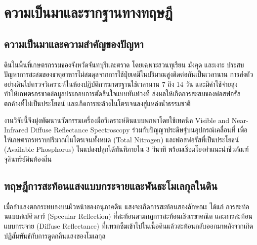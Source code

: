 \documentclass[12pt,a4paper,oneside]{book}
\begin{document}
\clearpage
\tableofcontents

\mainmatter

\chapter{ความเป็นมาและรากฐานทางทฤษฎี}

\section{ความเป็นมาและความสำคัญของปัญหา}
ดินในพื้นที่เกษตรกรรมของจังหวัดจันทบุรีและตราด โดยเฉพาะสวนทุเรียน มังคุด และเงาะ ประสบปัญหาการสะสมของธาตุอาหารไม่สมดุลจากการใช้ปุ๋ยเคมีในปริมาณสูงติดต่อกันเป็นเวลานาน การส่งตัวอย่างดินไปตรวจวิเคราะห์ในห้องปฏิบัติการมาตรฐานใช้เวลานาน 7 ถึง 14 วัน และมีค่าใช้จ่ายสูง ทำให้เกษตรกรขาดข้อมูลประกอบการตัดสินใจแบบทันท่วงที ส่งผลให้เกิดการสะสมของฟอสฟอรัสตกค้างที่ไม่เป็นประโยชน์ และเกิดการชะล้างไนโตรเจนลงสู่แหล่งน้ำธรรมชาติ

งานวิจัยนี้จึงมุ่งพัฒนานวัตกรรมเครื่องมือวิเคราะห์ดินแบบพกพาโดยใช้เทคนิค Visible and Near-Infrared Diffuse Reflectance Spectroscopy ร่วมกับปัญญาประดิษฐ์บนอุปกรณ์เคลื่อนที่ เพื่อให้เกษตรกรทราบปริมาณไนโตรเจนทั้งหมด (Total Nitrogen) และฟอสฟอรัสที่เป็นประโยชน์ (Available Phosphorus) ในแปลงปลูกได้ทันทีภายใน 3 วินาที พร้อมเชื่อมโยงคำแนะนำชีวภัณฑ์จุลินทรีย์ดินท้องถิ่น

\section{ทฤษฎีการสะท้อนแสงแบบกระจายและพันธะโมเลกุลในดิน}
เมื่อลำแสงตกกระทบลงบนผิวหน้าของอนุภาคดิน แสงจะเกิดการสะท้อนสองลักษณะ ได้แก่ การสะท้อนแบบสเปคิวลาร์ (Specular Reflection) ที่สะท้อนตามกฎการสะท้อนเชิงเรขาคณิต และการสะท้อนแบบกระจาย (Diffuse Reflectance) ที่แทรกซึมเข้าไปในเนื้อดินแล้วสะท้อนกลับออกมาหลังจากเกิดปฏิสัมพันธ์กับการดูดกลืนแสงของโมเลกุล
\end{document}
